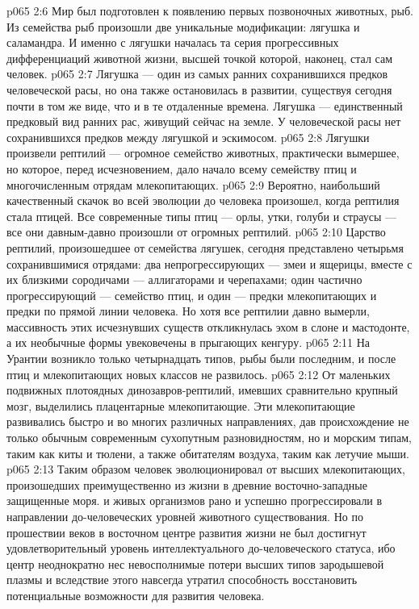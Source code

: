 \vs p065 2:6 \pc Мир был подготовлен к появлению первых позвоночных животных, рыб. Из семейства рыб произошли две уникальные модификации: лягушка и саламандра. И именно с лягушки началась та серия прогрессивных дифференциаций животной жизни, высшей точкой которой, наконец, стал сам человек.
\vs p065 2:7 Лягушка --- один из самых ранних сохранившихся предков человеческой расы, но она также остановилась в развитии, существуя сегодня почти в том же виде, что и в те отдаленные времена. Лягушка --- единственный предковый вид ранних рас, живущий сейчас на земле. У человеческой расы нет сохранившихся предков между лягушкой и эскимосом.
\vs p065 2:8 \pc Лягушки произвели рептилий --- огромное семейство животных, практически вымершее, но которое, перед исчезновением, дало начало всему семейству птиц и многочисленным отрядам млекопитающих.
\vs p065 2:9 Вероятно, наибольший качественный скачок во всей эволюции до человека произошел, когда рептилия стала птицей. Все современные типы птиц --- орлы, утки, голуби и страусы --- все они давным\hyp{}давно произошли от огромных рептилий.
\vs p065 2:10 Царство рептилий, произошедшее от семейства лягушек, сегодня представлено четырьмя сохранившимися отрядами: два непрогрессирующих --- змеи и ящерицы, вместе с их близкими сородичами --- аллигаторами и черепахами; один частично прогрессирующий --- семейство птиц, и один --- предки млекопитающих и предки по прямой линии человека. Но хотя все рептилии давно вымерли, массивность этих исчезнувших существ откликнулась эхом в слоне и мастодонте, а их необычные формы увековечены в прыгающих кенгуру.
\vs p065 2:11 \pc На Урантии возникло только четырнадцать типов, рыбы были последним, и после птиц и млекопитающих новых классов не развилось.
\vs p065 2:12 \pc От маленьких подвижных плотоядных динозавров\hyp{}рептилий, имевших сравнительно крупный мозг,  выделились плацентарные млекопитающие. Эти млекопитающие развивались быстро и во многих различных направлениях, дав происхождение не только обычным современным сухопутным разновидностям, но и морским типам, таким как киты и тюлени, а также обитателям воздуха, таким как летучие мыши.
\vs p065 2:13 Таким образом человек эволюционировал от высших млекопитающих, произошедших преимущественно из  жизни в древние восточно\hyp{}западные защищенные моря.  и  живых организмов рано и успешно прогрессировали в направлении до\hyp{}человеческих уровней животного существования. Но по прошествии веков в восточном центре развития жизни не был достигнут удовлетворительный уровень интеллектуального до\hyp{}человеческого статуса, ибо центр неоднократно нес невосполнимые потери высших типов зародышевой плазмы и вследствие этого навсегда утратил способность восстановить потенциальные возможности для развития человека.
